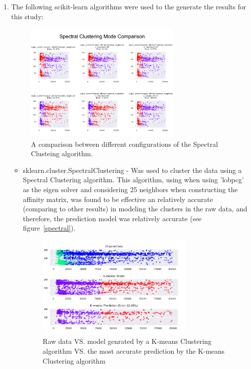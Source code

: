 \documentclass[10pt,twocolumn]{article}
\begin{document}
\begin{enumerate}
  \item The following scikit-learn algorithms were used to the generate the results for this study:
  \begin{figure}[!t]
    \begin{center}
      \includegraphics[width=3in]{../plots/spectral_all.png}
    \end{center}
    \label{spectral_all}
    \caption{\small A comparison between different configurations of the Spectral Clusteing algorithm.}
  \end{figure}
    \begin{itemize}
      \item sklearn.cluster.SpectralClustering - Was used to cluster the data using a Spectral Clustering algorithm. This algorithm, using when using 'lobpcg' as the eigen solver and considering 25 neighbors when constructing the affinity matrix, was found to be effective an relatively accurate (comparing to other results) in modeling the clusters in the raw data, and therefore, the prediction model was relatively accurate (see figure~\ref{spectral}).

          \begin{figure}[!t]
            \begin{center}
               \includegraphics[width=3in]{../plots/k-means.png}
            \end{center}
            \label{k-means}
            \caption{\small Raw data VS. model genrated by a K-means Clustering algorithm VS. the most accurate prediction by the K-means Clustering algorithm}
          \end{figure}



\end{itemize}
\end{enumerate}
\end{document}

